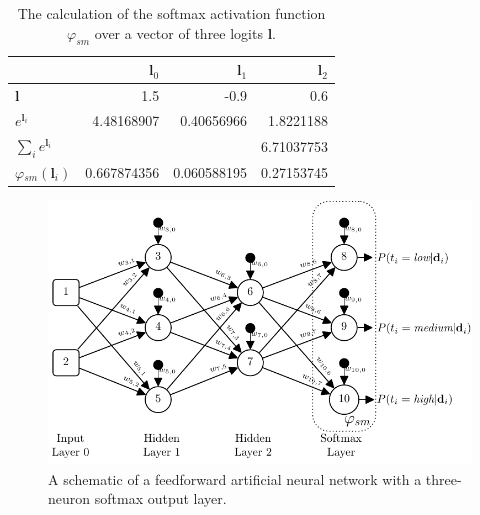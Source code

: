 \documentclass[xcolor={table}]{beamer}
\newcommand{\featN}[1]{\textsc{#1}}
\begin{document}
 \begin{frame}[plain]
\begin{table}
\caption[The calculation of the softmax activation function $\varphi_{sm}$ over a vector of three logits $\mathbf{l}$.]{The calculation of the softmax activation function $\varphi_{sm}$ over a vector of three logits $\mathbf{l}$.}
\label{tab:softmax}
\begin{tabular}{lrrr}
\hline
~  & $\mathbf{l}_0$ & $\mathbf{l}_1$ & $\mathbf{l}_2$ \\ 
\hline
\featN{$\mathbf{l}$} & 1.5 & -0.9 & 0.6\\
\featN{$e^{\mathbf{l}_i}$} & 4.48168907 & 0.40656966 & 1.8221188\\
\featN{$\sum_{i}e^{\mathbf{l}_i}$} & ~ & ~ & 6.71037753\\
\featN{$\varphi_{sm}(\mathbf{l}_i)$} & 0.667874356 & 0.060588195 & 0.27153745\\
\hline
\end{tabular}
\end{table}
\end{frame} 



 \begin{frame} 
\begin{figure}[t]
\centerline{
\includegraphics[width=\textwidth]{./images/fmlpda_8_27.pdf}
}
\caption[A schematic of a feedforward artificial neural network with a three-neuron softmax output layer.]{A schematic of a feedforward artificial neural network with a three-neuron softmax output layer.}
\label{fig:nn-softmax-output}
\end{figure}
\end{frame} 
\end{document}
